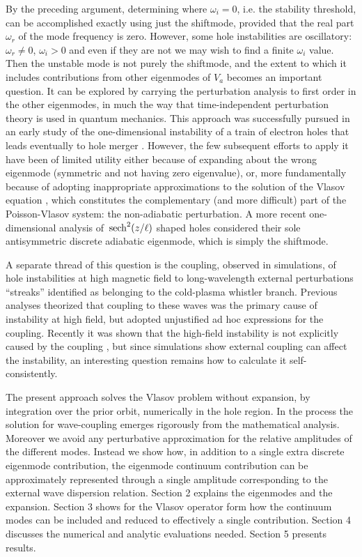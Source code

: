 \documentclass{jpp}
\def\sech{{\,\rm sech}}
\begin{document}
By the preceding argument, determining where $\omega_i=0$, i.e. the
stability threshold, can be accomplished exactly using just the
shiftmode, provided that the real part $\omega_r$ of the mode
frequency is zero. However, some hole instabilities are oscillatory:
$\omega_r\not=0$, $\omega_i>0$ and even if they are not we may wish to
find a finite $\omega_i$ value. Then the unstable mode is not purely
the shiftmode, and the extent to which it includes contributions from
other eigenmodes of $V_a$ becomes an important question. It can be
explored by carrying the perturbation analysis to first order in the
other eigenmodes, in much the way that time-independent perturbation
theory is used in quantum mechanics. This approach was successfully
pursued in an early study of the one-dimensional instability of a
train of electron holes that leads eventually to hole merger
\citep{Schwarzmeier1979}. However, the few subsequent efforts to apply
it \citep{Schamel1982,Schamel1987,Collantes1988} have been of limited
utility either because of expanding about the wrong eigenmode
(symmetric and not having zero eigenvalue), or, more fundamentally
because of adopting inappropriate approximations to the solution of
the Vlasov equation \citep{Jovanovic2002}, which constitutes the
complementary (and more difficult) part of the Poisson-Vlasov system:
the non-adiabatic perturbation. A more recent one-dimensional analysis
\citep{Dokgo2016} of $\sech^2(z/\ell)$ shaped holes considered their
sole antisymmetric discrete adiabatic eigenmode, which is simply the
shiftmode.

A separate thread of this question is the coupling, observed in
simulations\citep{Oppenheim1999,Oppenheim2001b,Lu2008}, of hole
instabilities at high magnetic field to long-wavelength external
perturbations ``streaks'' identified as belonging to the cold-plasma
whistler branch. Previous analyses
\citep{Newman2001a,Vetoulis2001,Berthomier2002} theorized that
coupling to these waves was the primary cause of instability at high
field, but adopted unjustified ad hoc expressions for the
coupling. Recently it was shown that the high-field instability is not
explicitly caused by the coupling \citep{Hutchinson2019a}, but since
simulations show external coupling can affect the instability, an
interesting question remains how to calculate it self-consistently.

The present approach solves the Vlasov problem without expansion, by
integration over the prior orbit, numerically in the hole region.  In
the process the solution for wave-coupling emerges rigorously from the
mathematical analysis. Moreover we avoid any perturbative
approximation for the relative amplitudes of the different modes.
Instead we show how, in addition to a single extra discrete eigenmode
contribution, the eigenmode continuum contribution can be
approximately represented through a single amplitude corresponding to
the external wave dispersion relation.  Section 2 explains the
eigenmodes and the expansion. Section 3 shows for the Vlasov operator
form how the continuum modes can be included and reduced to
effectively a single contribution. Section 4 discusses the numerical
and analytic evaluations needed. Section 5 presents results.
\end{document}
